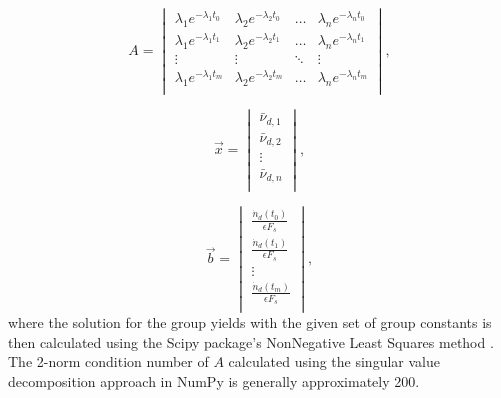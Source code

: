 \documentclass{style/nseJournal}
\begin{document}
\begin{equation}
A = 
\begin{vmatrix}
\lambda_1 e^{-\lambda_1 t_0} & \lambda_2 e^{-\lambda_2 t_0} & \hdots &  \lambda_n e^{-\lambda_n t_0}\\
\lambda_1 e^{-\lambda_1 t_1} & \lambda_2 e^{-\lambda_2 t_1} & \hdots &  \lambda_n e^{-\lambda_n t_1}\\
\vdots                       & \vdots                       & \ddots &  \vdots                      \\
\lambda_1 e^{-\lambda_1 t_m} & \lambda_2 e^{-\lambda_2 t_m} &  \hdots  & \lambda_n e^{-\lambda_n t_m}\\
\end{vmatrix}
\label{eq:lambda},
\end{equation}

\begin{equation}
\vec{x} = 
\begin{vmatrix}
\bar{\nu}_{d,1}\\
\bar{\nu}_{d,2}\\
\vdots\\
\bar{\nu}_{d,n}\\
\end{vmatrix},
\end{equation}

\begin{equation}
\label{eq:bvec_new}
\vec{b} = 
\begin{vmatrix}
\frac{\dot{n}_d(t_0)}{\epsilon F_s}\\
\frac{\dot{n}_d(t_1)}{\epsilon F_s}\\
\vdots\\
\frac{\dot{n}_d(t_m)}{\epsilon F_s}\\
\end{vmatrix},
\end{equation}
where the solution for the group yields with the given set of group constants is then calculated using the Scipy package's NonNegative Least Squares method \cite{lawson1995solving, bro1997fast}.
The 2-norm condition number of $A$ calculated using the singular value decomposition approach in NumPy is generally approximately 200.

\end{document}
